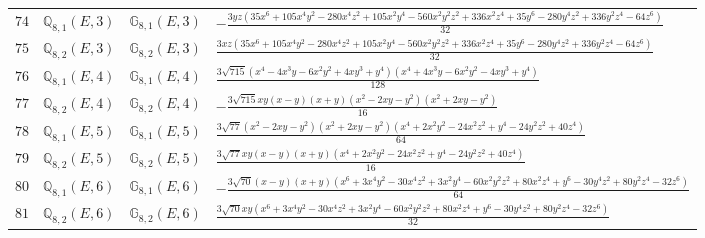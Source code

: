 \documentclass[fleqn,8pt,landscape]{jsarticle}
\begin{document}
\begin{table}[ht!]
\begin{center}
\begin{tabular}{cccl}
$ 74 $ & $ \mathbb{Q}_{8,1}(E,3) $ & $ \mathbb{G}_{8,1}(E,3) $ & $ - \frac{3 y z \left(35 x^{6} + 105 x^{4} y^{2} - 280 x^{4} z^{2} + 105 x^{2} y^{4} - 560 x^{2} y^{2} z^{2} + 336 x^{2} z^{4} + 35 y^{6} - 280 y^{4} z^{2} + 336 y^{2} z^{4} - 64 z^{6}\right)}{32} $ \\
$ 75 $ & $ \mathbb{Q}_{8,2}(E,3) $ & $ \mathbb{G}_{8,2}(E,3) $ & $ \frac{3 x z \left(35 x^{6} + 105 x^{4} y^{2} - 280 x^{4} z^{2} + 105 x^{2} y^{4} - 560 x^{2} y^{2} z^{2} + 336 x^{2} z^{4} + 35 y^{6} - 280 y^{4} z^{2} + 336 y^{2} z^{4} - 64 z^{6}\right)}{32} $ \\
$ 76 $ & $ \mathbb{Q}_{8,1}(E,4) $ & $ \mathbb{G}_{8,1}(E,4) $ & $ \frac{3 \sqrt{715} \left(x^{4} - 4 x^{3} y - 6 x^{2} y^{2} + 4 x y^{3} + y^{4}\right) \left(x^{4} + 4 x^{3} y - 6 x^{2} y^{2} - 4 x y^{3} + y^{4}\right)}{128} $ \\
$ 77 $ & $ \mathbb{Q}_{8,2}(E,4) $ & $ \mathbb{G}_{8,2}(E,4) $ & $ - \frac{3 \sqrt{715} x y \left(x - y\right) \left(x + y\right) \left(x^{2} - 2 x y - y^{2}\right) \left(x^{2} + 2 x y - y^{2}\right)}{16} $ \\
$ 78 $ & $ \mathbb{Q}_{8,1}(E,5) $ & $ \mathbb{G}_{8,1}(E,5) $ & $ \frac{3 \sqrt{77} \left(x^{2} - 2 x y - y^{2}\right) \left(x^{2} + 2 x y - y^{2}\right) \left(x^{4} + 2 x^{2} y^{2} - 24 x^{2} z^{2} + y^{4} - 24 y^{2} z^{2} + 40 z^{4}\right)}{64} $ \\
$ 79 $ & $ \mathbb{Q}_{8,2}(E,5) $ & $ \mathbb{G}_{8,2}(E,5) $ & $ \frac{3 \sqrt{77} x y \left(x - y\right) \left(x + y\right) \left(x^{4} + 2 x^{2} y^{2} - 24 x^{2} z^{2} + y^{4} - 24 y^{2} z^{2} + 40 z^{4}\right)}{16} $ \\
$ 80 $ & $ \mathbb{Q}_{8,1}(E,6) $ & $ \mathbb{G}_{8,1}(E,6) $ & $ - \frac{3 \sqrt{70} \left(x - y\right) \left(x + y\right) \left(x^{6} + 3 x^{4} y^{2} - 30 x^{4} z^{2} + 3 x^{2} y^{4} - 60 x^{2} y^{2} z^{2} + 80 x^{2} z^{4} + y^{6} - 30 y^{4} z^{2} + 80 y^{2} z^{4} - 32 z^{6}\right)}{64} $ \\
$ 81 $ & $ \mathbb{Q}_{8,2}(E,6) $ & $ \mathbb{G}_{8,2}(E,6) $ & $ \frac{3 \sqrt{70} x y \left(x^{6} + 3 x^{4} y^{2} - 30 x^{4} z^{2} + 3 x^{2} y^{4} - 60 x^{2} y^{2} z^{2} + 80 x^{2} z^{4} + y^{6} - 30 y^{4} z^{2} + 80 y^{2} z^{4} - 32 z^{6}\right)}{32} $ \\
 \hline \hline
\end{tabular}
\end{center}
\end{table}
\end{document}
